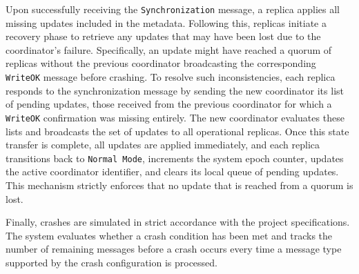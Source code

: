 Upon successfully receiving the \texttt{Synchronization} message, a replica applies all missing updates included in the metadata. Following this, replicas initiate a recovery phase to retrieve any updates that may have been lost due to the coordinator's failure. Specifically, an update might have reached a quorum of replicas without the previous coordinator broadcasting the corresponding \texttt{WriteOK} message before crashing. To resolve such inconsistencies, each replica responds to the synchronization message by sending the new coordinator its list of pending updates, those received from the previous coordinator for which a \texttt{WriteOK} confirmation was missing entirely.
The new coordinator evaluates these lists and broadcasts the set of updates to all operational replicas. Once this state transfer is complete, all updates are applied immediately, and each replica transitions back to \texttt{Normal Mode}, increments the system epoch counter, updates the active coordinator identifier, and clears its local queue of pending updates. This mechanism strictly enforces that no update that is reached from a quorum is lost.

Finally, crashes are simulated in strict accordance with the project specifications. The system evaluates whether a crash condition has been met and tracks the number of remaining messages before a crash occurs every time a message type supported by the crash configuration is processed.
